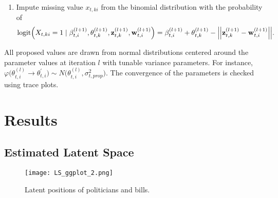 \documentclass[a4paper, 11pt]{report}
\begin{document}
\begin{itemize}
\begin{enumerate}
\item Impute missing value $x_{t,ki}$ from the binomial distribution with the probability of
\begin{equation*}
    \mbox{logit}\Big(X_{t,ki} = 1 \mid \beta_{t,i}^{(l+1)}, \theta_{t,k}^{(l+1)}, {\bf z}_{t,k}^{(l+1)}, {\bf w}_{t,i}^{(l+1)}\Big)
    = \beta_{t,i}^{(l+1)} + \theta_{t,k}^{(l+1)} - \Big|\Big|{\bf z}_{t,k}^{(l+1)} - {\bf w}_{t,i}^{(l+1)}\Big|\Big|.
\end{equation*}

\end{enumerate}

\quad All proposed values are drawn from normal distributions centered around the parameter values at iteration $l$ with tunable variance parameters. For instance, $\varphi \big(\theta_{t,i}^{(l)} \rightarrow \theta_{t,i}^{\prime}\big) \sim N\big(\theta_{t,i}^{(l)}, \sigma^2_{t,prop} \big)$. The convergence of the parameters is checked using trace plots.







\chapter{Results} \label{Chapter6}
\section{Estimated Latent Space}
\begin{figure}
\begin{center}
\texttt{[image: LS\_ggplot\_2.png]}
\caption{Latent positions of politicians and bills.}
\label{fig:ls}
\end{center}
\end{figure}


\end{itemize}
\end{document}
